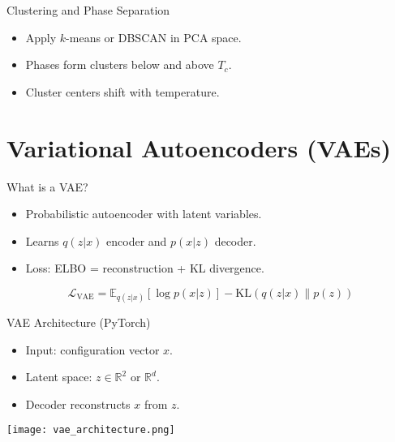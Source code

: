 \documentclass{beamer}
\begin{document}
\begin{frame}{Clustering and Phase Separation}
\begin{itemize}
    \item Apply $k$-means or DBSCAN in PCA space.
    \item Phases form clusters below and above $T_c$.
    \item Cluster centers shift with temperature.
\end{itemize}
\end{frame}

\section{Variational Autoencoders (VAEs)}
\begin{frame}{What is a VAE?}
\begin{itemize}
    \item Probabilistic autoencoder with latent variables.
    \item Learns $q(z|x)$ encoder and $p(x|z)$ decoder.
    \item Loss: ELBO = reconstruction + KL divergence.
\end{itemize}
\begin{equation*}
\mathcal{L}_{\text{VAE}} = \mathbb{E}_{q(z|x)}[\log p(x|z)] - \text{KL}(q(z|x)\|p(z))
\end{equation*}
\end{frame}

\begin{frame}{VAE Architecture (PyTorch)}
\begin{itemize}
    \item Input: configuration vector $x$.
    \item Latent space: $z \in \mathbb{R}^2$ or $\mathbb{R}^d$.
    \item Decoder reconstructs $x$ from $z$.
\end{itemize}
\texttt{[image: vae\_architecture.png]}
\end{frame}

\end{document}
